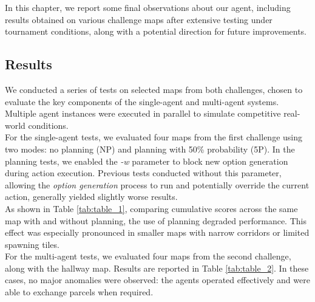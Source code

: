     In this chapter, we report some final observations about our agent, including results obtained on various challenge maps after extensive testing under tournament conditions, along with a potential direction for future improvements.

    \subsection{Results}
        We conducted a series of tests on selected maps from both challenges, chosen to evaluate the key components of the single-agent and multi-agent systems. Multiple agent instances were executed in parallel to simulate competitive real-world conditions.
        \medskip\\
        For the single-agent tests, we evaluated four maps from the first challenge using two modes: no planning (NP) and planning with 50\% probability (5P). In the planning tests, we enabled the \textit{-w} parameter to block new option generation during action execution. Previous tests conducted without this parameter, allowing the \textit{option generation} process to run and potentially override the current action, generally yielded slightly worse results.
        \medskip\\
        As shown in Table \ref{tab:table_1}, comparing cumulative scores across the same map with and without planning, the use of planning degraded performance. This effect was especially pronounced in smaller maps with narrow corridors or limited spawning tiles.
        \medskip\\
        For the multi-agent tests, we evaluated four maps from the second challenge, along with the hallway map. Results are reported in Table \ref{tab:table_2}. In these cases, no major anomalies were observed: the agents operated effectively and were able to exchange parcels when required.
    
